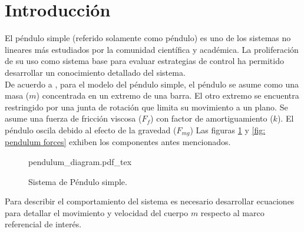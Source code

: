 \section{Introducción}


El péndulo simple (referido solamente como péndulo) es uno 
de los sistemas no lineares más estudiados por la 
comunidad científica y académica. La proliferación de su
uso como sistema base para evaluar estrategias de control ha
permitido desarrollar un conocimiento detallado del sistema.\\


De acuerdo a \cite{sastry}, para el modelo del péndulo simple, 
el péndulo se asume como una masa ($m$) concentrada en un extremo
de una barra. El otro extremo se encuentra restringido por una
junta de rotación que limita su movimiento a un plano. 
Se asume una fuerza de fricción viscosa ($F_f$) con factor de amortiguamiento
 ($k$). El péndulo oscila debido al efecto de la gravedad ($F_{mg}$)
Las figuras \ref{fig: simple pendulum} y \ref{fig: pendulum forces} exhiben 
los componentes antes mencionados.

 \begin{figure}[ht]
    \centering
    {pendulum_diagram.pdf_tex}
    \caption{Sistema de Péndulo simple.}
    \label{fig: simple pendulum}
\end{figure}


Para describir el comportamiento del sistema es necesario desarrollar
ecuaciones para detallar el movimiento y velocidad del cuerpo $m$ 
respecto al marco referencial de interés.

